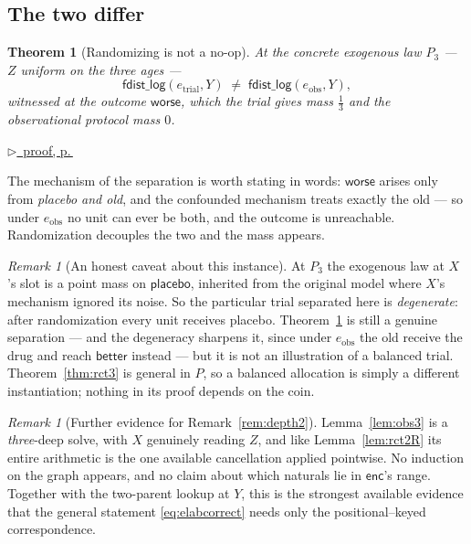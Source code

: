 \documentclass[11pt,a4paper]{article}
\theoremstyle{definition}
\theoremstyle{plain}
\newtheorem{theorem}[definition]{Theorem}
\theoremstyle{remark}
\newtheorem{remark}[definition]{Remark}
\newcommand{\enc}{\mathsf{enc}}
\newcommand{\pfref}[1]{%
  \par\smallskip\noindent
  \hyperref[pf:#1]{\small$\triangleright$\ proof, p.\,\pageref{pf:#1}}\par\smallskip}
\begin{document}
\subsection{The two differ}

\begin{theorem}[Randomizing is not a no-op]
\label{thm:sep3}
At the concrete exogenous law $P_3$ --- $Z$ uniform on the three ages ---
\[
  \mathsf{fdist\_log}(e_{\mathrm{trial}}, Y)
  \;\neq\;
  \mathsf{fdist\_log}(e_{\mathrm{obs}}, Y),
\]
witnessed at the outcome $\textsf{worse}$, which the trial gives mass
$\tfrac{1}{3}$ and the observational protocol mass $0$.
\end{theorem}

\pfref{thm:sep3}

The mechanism of the separation is worth stating in words: $\textsf{worse}$
arises only from \emph{placebo and old}, and the confounded mechanism
treats exactly the old --- so under $e_{\mathrm{obs}}$ no unit can ever be
both, and the outcome is unreachable. Randomization decouples the two and
the mass appears.

\begin{remark}[An honest caveat about this instance]
At $P_3$ the exogenous law at $X$'s slot is a point mass on
$\textsf{placebo}$, inherited from the original model where $X$'s mechanism
ignored its noise. So the particular trial separated here is
\emph{degenerate}: after randomization every unit receives placebo.
Theorem~\ref{thm:sep3} is still a genuine separation --- and the
degeneracy sharpens it, since under $e_{\mathrm{obs}}$ the old receive the
drug and reach $\textsf{better}$ instead --- but it is not an illustration
of a balanced trial. Theorem~\ref{thm:rct3} is general in $P$, so a
balanced allocation is simply a different instantiation; nothing in its
proof depends on the coin.
\end{remark}

\begin{remark}[Further evidence for Remark~\ref{rem:depth2}]
Lemma~\ref{lem:obs3} is a \emph{three}-deep solve, with $X$ genuinely
reading $Z$, and like Lemma~\ref{lem:rct2R} its entire arithmetic is the
one available cancellation applied pointwise. No induction on the graph
appears, and no claim about which naturals lie in $\enc$'s range. Together
with the two-parent lookup at $Y$, this is the strongest available evidence
that the general statement \eqref{eq:elabcorrect} needs only the
positional--keyed correspondence.
\end{remark}
\end{document}
